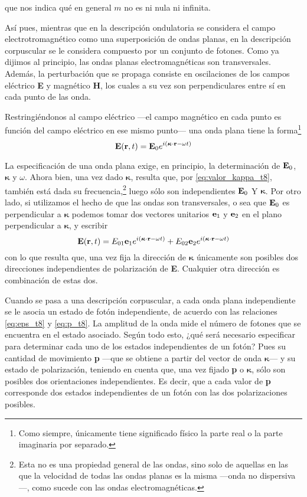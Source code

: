que nos indica qué en general $m$ no es ni nula ni infinita.

Así pues, mientras que en la descripción ondulatoria se considera el campo electrotromagnético como una superposición de ondas planas, en la descripción corpuscular se le considera compuesto por un conjunto de fotones.
Como ya dijimos al principio, las ondas planas electromagnéticas son transversales.
Además, la perturbación que se propaga consiste en oscilaciones de los campos eléctrico \textbf{E} y magnético \textbf{H}, los cuales a su vez son perpendiculares entre sí en cada punto de las onda.

Restringiéndonos al campo eléctrico ---el campo magnético en cada punto es función del campo eléctrico en ese mismo punto--- una onda plana tiene la forma\footnote{Como siempre, únicamente tiene significado físico la parte real o la parte imaginaria por separado.}
\begin{equation}
	\vb{E}(\vb{r}, t) = \vb{E}_0 e^{i(\bm{\kappa}\cdot\vb{r}-\omega t)}
\end{equation}

La especificación de una onda plana exige, en principio, la determinación de $\vb{E}_0$, $\bm{\kappa}$ y $\omega$.
Ahora bien, una vez dado $\bm{\kappa}$, resulta que, por \eqref{eq:valor_kappa_t8}, también está dada su frecuencia,\footnote{ Esta no es una propiedad general de las ondas, sino solo de aquellas en las que la velocidad de todas las ondas planas es la misma ---onda no dispersiva---, como sucede con las ondas electromagnéticas.} luego sólo son independientes $\vb{E}_0$ Y $\bm{\kappa}$.
Por otro lado, si utilizamos el hecho de que las ondas son transversales, o sea que $\vb{E}_0$ es perpendicular a $\bm{\kappa}$ podemos tomar dos vectores unitarios $\vb{e}_1$ y $\vb{e}_2$ en el plano perpendicular a $\bm{\kappa}$, y escribir
\begin{equation}
	\vb{E}(\vb{r}, t) = E_{01} \vb{e}_1 e^{i(\bm{\kappa}\cdot\vb{r}-\omega t)} + E_{02} \vb{e}_2 e^{i(\bm{\kappa}\cdot\vb{r}-\omega t)}
\end{equation}
con lo que resulta que, una vez fija la dirección de $\bm{\kappa}$ únicamente son posibles dos direcciones independientes de polarización de \textbf{E}. Cualquier otra dirección es combinación de estas dos.

Cuando se pasa a una descripción corpuscular, a cada onda plana independiente se le asocia un estado de fotón independiente, de acuerdo con las relaciones \eqref{eq:eps_t8} y \eqref{eq:p_t8}.
La amplitud de la onda mide el número de fotones que se encuentra en el estado asociado.
Según todo esto, ¿qué será necesario especificar para determinar cada uno de los estados independientes de un fotón?
Pues su cantidad de movimiento \textbf{p} ---que se obtiene a partir del vector de onda $\bm{\kappa}$--- y su estado de polarización, teniendo en cuenta que, una vez fijado \textbf{p} o $\bm{\kappa}$, sólo son posibles dos orientaciones independientes.
Es decir, que a cada valor de \textbf{p} corresponde dos estados independientes de un fotón con las dos polarizaciones posibles.

